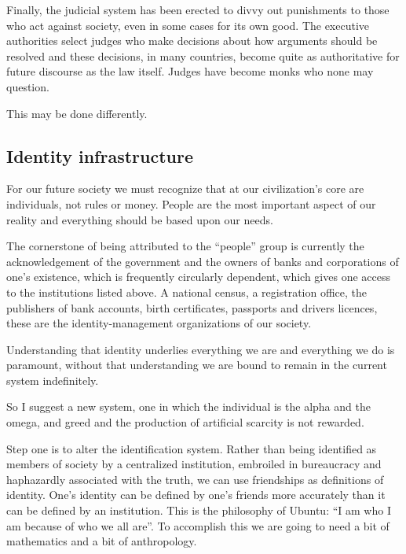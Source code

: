 F\hbox{}inally, the judicial system has been erected to divvy out punishments 
to those who act against society, even in some cases for its own good. The
executive authorities select judges who make decisions about how arguments
should be resolved and these decisions, in many countries, become quite as
authoritative for future discourse as the law itself. Judges have become monks
who none may question.

This may be done dif\hbox{}ferently.


\subsection{Identity infrastructure}
\label{s:artificial_scarcity:five_steps:identity_infrastructure}

For our future society we must recognize that at our civilization's core are
individuals, not rules or money. People are the most important aspect of our
reality and everything should be based upon our needs.

The cornerstone of being attributed to the ``people'' group is currently the
acknowledgement of the government and the owners of banks and corporations of
one's existence, which is frequently circularly dependent, which gives one
access to the institutions listed above. A national census, a registration
of\hbox{}f\hbox{}ice, the publishers of bank accounts, birth
certif\hbox{}icates, passports and drivers licences, these are the
identity-management organizations of our society.

Understanding that identity underlies everything we are and everything we do is
paramount, without that understanding we are bound to remain in the current
system indef\hbox{}initely.

So I suggest a new system, one in which the individual is the alpha and the
omega, and greed and the production of artif\hbox{}icial scarcity is not
rewarded.

Step one is to alter the identif\hbox{}ication system. Rather than being
identif\hbox{}ied as members of society by a centralized institution, embroiled
in bureaucracy and haphazardly associated with the truth, we can use friendships
as def\hbox{}initions of identity. One's identity can be def\hbox{}ined by one's
friends more accurately than it can be def\hbox{}ined by an institution. This is
the philosophy of Ubuntu: ``I am who I am because of who we all are''. To
accomplish this we are going to need a bit of mathematics and a bit of
anthropology.

